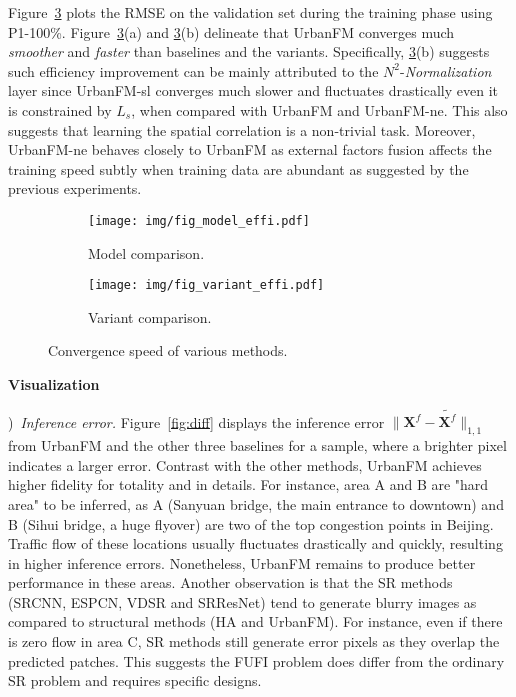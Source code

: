 \noindent Figure~\ref{fig:efficiency} plots the RMSE on the validation set during the training phase using P1-100\%. Figure~\ref{fig:efficiency}(a) and \ref{fig:efficiency}(b) delineate that UrbanFM converges much \textit{smoother} and \textit{faster} than baselines and the variants. Specifically, \ref{fig:efficiency}(b) suggests such efficiency improvement can be mainly attributed to the $N^2$-\textit{Normalization} layer since UrbanFM-sl converges much slower and fluctuates drastically even it is constrained by $L_s$, when compared with UrbanFM and UrbanFM-ne. This also suggests that learning the spatial correlation is a non-trivial task. Moreover, UrbanFM-ne behaves closely to UrbanFM as external factors fusion affects the training speed subtly when training data are abundant as suggested by the previous experiments.
\begin{figure}[!h]
	\centering
	\vspace{-1em}
	\begin{subfigure}[b]{0.225\textwidth}
		\texttt{[image: img/fig\_model\_effi.pdf]}	
		\caption{\label{fig:effi1}Model comparison.}
	\end{subfigure}
	\hspace{1mm}
	\begin{subfigure}[b]{0.220\textwidth}
		\texttt{[image: img/fig\_variant\_effi.pdf]}
		\caption{\label{fig:effi2}Variant comparison.}
	\end{subfigure}
	\vspace{-1em}
	\caption{Convergence speed of various methods.}
	\label{fig:efficiency}
\end{figure}


\vspace{1mm}
\noindent\textbf{Visualization}

)~\textit{Inference error.} Figure~\ref{fig:diff} displays the inference error $\lVert \mathbf{X}^f-\tilde{\mathbf{X}^f} \rVert_{1,1}$ from UrbanFM and the other three baselines for a sample, where a brighter pixel indicates a larger error. Contrast with the other methods, UrbanFM achieves higher fidelity for totality and in details. For instance, area A and B are "hard area" to be inferred, as A (Sanyuan bridge, the main entrance to downtown) and B (Sihui bridge, a huge flyover) are two of the top congestion points in Beijing. Traffic flow of these locations usually fluctuates drastically and quickly, resulting in higher inference errors. Nonetheless, UrbanFM remains to produce better performance in these areas. Another observation is that the SR methods (SRCNN, ESPCN, VDSR and SRResNet) tend to generate blurry images as compared to structural methods (HA and UrbanFM). For instance, even if there is zero flow in area C, SR methods still generate error pixels as they overlap the predicted patches. This suggests the FUFI problem does differ from the ordinary SR problem and requires specific designs.


